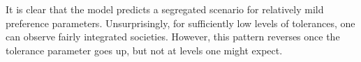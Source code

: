 \documentclass[../main.tex]{subfiles}
\begin{document}
It is clear that the model predicts a segregated scenario for relatively mild preference parameters. Unsurprisingly, for sufficiently low levels of tolerances, one can observe fairly integrated societies. However, this pattern reverses once the tolerance parameter goes up, but not at levels one might expect. 
\end{document}
